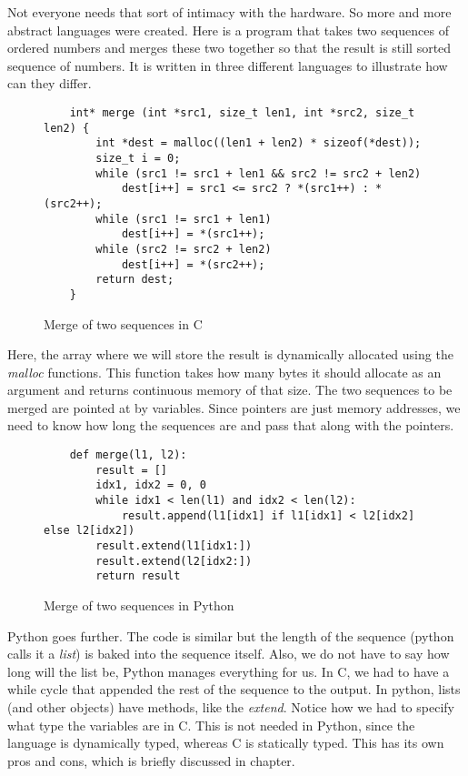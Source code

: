Not everyone needs that sort of intimacy with the hardware. So more and more abstract languages were created.
Here is a program that takes two sequences of ordered numbers and merges these two together so that the result
is still sorted sequence of numbers. It is written in three different languages to illustrate how can they differ.

\begin{figure}[H]\label{fig:merge-c}
    \begin{verbatim}
    int* merge (int *src1, size_t len1, int *src2, size_t len2) {
        int *dest = malloc((len1 + len2) * sizeof(*dest));
        size_t i = 0;
        while (src1 != src1 + len1 && src2 != src2 + len2)
            dest[i++] = src1 <= src2 ? *(src1++) : *(src2++);
        while (src1 != src1 + len1)
            dest[i++] = *(src1++);
        while (src2 != src2 + len2)
            dest[i++] = *(src2++);
        return dest;
    }
    \end{verbatim}
    \caption{Merge of two sequences in C}
\end{figure}

Here, the array where we will store the result is dynamically allocated using
the \textit{malloc} functions. This function takes how many bytes it should
allocate as an argument and returns continuous memory of that size. The two
sequences to be merged are pointed at by variables. Since pointers are just
memory addresses, we need to know how long the sequences are and pass that
along with the pointers.

\begin{figure}[H]
    \begin{verbatim}
    def merge(l1, l2):
        result = []
        idx1, idx2 = 0, 0
        while idx1 < len(l1) and idx2 < len(l2):
            result.append(l1[idx1] if l1[idx1] < l2[idx2] else l2[idx2])
        result.extend(l1[idx1:])
        result.extend(l2[idx2:])
        return result
    \end{verbatim}
    \caption{Merge of two sequences in Python}
\end{figure}

Python goes further. The code is similar but the length of the sequence (python calls it a \textit{list})
is baked into the sequence itself. Also, we do not have to say how long will the list be,
Python manages everything for us. In C, we had to have a while cycle that appended
the rest of the sequence to the output. In python, lists (and other objects) have methods,
like the \textit{extend}. Notice how we had to specify what type the variables are in C.
This is not needed in Python, since the language is dynamically typed, whereas 
C is statically typed. This has its own pros and cons, which is briefly discussed in  chapter.

